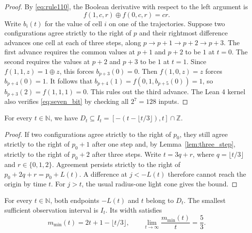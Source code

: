 \begin{proof}
By \eqref{eq:rule110}, the Boolean derivative with respect to the left argument is
\begin{equation}\label{eq:bool_deriv}
f(1, c, r) \oplus f(0, c, r) = cr.
\end{equation}
Write $b_i(t)$ for the value of cell $i$ on one of the trajectories. Suppose two configurations agree strictly to the right of $p$ and their rightmost difference advances one cell at each of three steps, along $p \to p+1 \to p+2 \to p+3$. The first advance requires the common values at $p+1$ and $p+2$ to be $1$ at $t=0$. The second requires the values at $p+2$ and $p+3$ to be $1$ at $t=1$. Since $f(1, 1, z) = 1 \oplus z$, this forces $b_{p+3}(0) = 0$. Then $f(1, 0, z) = z$ forces $b_{p+4}(0) = 1$. It follows that $b_{p+4}(1) = f(0, 1, b_{p+5}(0)) = 1$, so $b_{p+3}(2) = f(1, 1, 1) = 0$. This rules out the third advance. The Lean 4 kernel also verifies \eqref{eq:seven_bit} by checking all $2^7 = 128$ inputs.
\end{proof}

\begin{theorem}\label{thm:upper_bound}
For every $t \in \mathbb{N}$, we have $D_t \subseteq I_t = [-(t - \lfloor t/3 \rfloor), t] \cap \mathbb{Z}$.
\end{theorem}

\begin{proof}
If two configurations agree strictly to the right of $p_0$, they still agree strictly to the right of $p_0 + 1$ after one step and, by Lemma~\ref{lem:three_step}, strictly to the right of $p_0 + 2$ after three steps. Write $t = 3q + r$, where $q = \lfloor t/3 \rfloor$ and $r \in \{0, 1, 2\}$. Agreement persists strictly to the right of $p_0 + 2q + r = p_0 + L(t)$. A difference at $j < -L(t)$ therefore cannot reach the origin by time $t$. For $j > t$, the usual radius-one light cone gives the bound.
\end{proof}

\begin{theorem}\label{thm:sharpness}
For every $t \in \mathbb{N}$, both endpoints $-L(t)$ and $t$ belong to $D_t$. The smallest sufficient observation interval is $I_t$. Its width satisfies
\begin{equation}
m_{\min}(t) = 2t + 1 - \lfloor t/3 \rfloor, \qquad \lim_{t \to \infty} \frac{m_{\min}(t)}{t} = \frac{5}{3}.
\end{equation}
\end{theorem}

